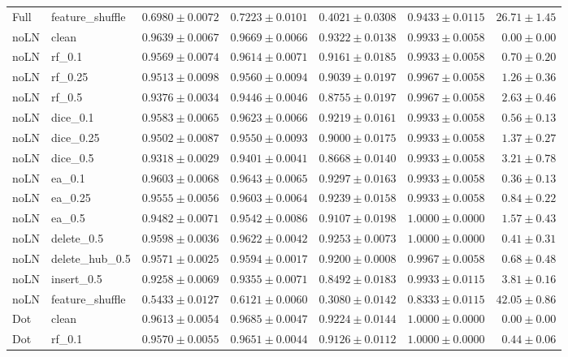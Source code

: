 \documentclass[UTF8,a4paper,11pt,fontset=fandol]{ctexart}
\begin{document}
{\begin{longtable}{llrrrrr}
Full & feature\_shuffle & $0.6980\pm0.0072$ & $0.7223\pm0.0101$ & $0.4021\pm0.0308$ & $0.9433\pm0.0115$ & $26.71\pm1.45$ \\
noLN & clean & $0.9639\pm0.0067$ & $0.9669\pm0.0066$ & $0.9322\pm0.0138$ & $0.9933\pm0.0058$ & $0.00\pm0.00$ \\
noLN & rf\_0.1 & $0.9569\pm0.0074$ & $0.9614\pm0.0071$ & $0.9161\pm0.0185$ & $0.9933\pm0.0058$ & $0.70\pm0.20$ \\
noLN & rf\_0.25 & $0.9513\pm0.0098$ & $0.9560\pm0.0094$ & $0.9039\pm0.0197$ & $0.9967\pm0.0058$ & $1.26\pm0.36$ \\
noLN & rf\_0.5 & $0.9376\pm0.0034$ & $0.9446\pm0.0046$ & $0.8755\pm0.0197$ & $0.9967\pm0.0058$ & $2.63\pm0.46$ \\
noLN & dice\_0.1 & $0.9583\pm0.0065$ & $0.9623\pm0.0066$ & $0.9219\pm0.0161$ & $0.9933\pm0.0058$ & $0.56\pm0.13$ \\
noLN & dice\_0.25 & $0.9502\pm0.0087$ & $0.9550\pm0.0093$ & $0.9000\pm0.0175$ & $0.9933\pm0.0058$ & $1.37\pm0.27$ \\
noLN & dice\_0.5 & $0.9318\pm0.0029$ & $0.9401\pm0.0041$ & $0.8668\pm0.0140$ & $0.9933\pm0.0058$ & $3.21\pm0.78$ \\
noLN & ea\_0.1 & $0.9603\pm0.0068$ & $0.9643\pm0.0065$ & $0.9297\pm0.0163$ & $0.9933\pm0.0058$ & $0.36\pm0.13$ \\
noLN & ea\_0.25 & $0.9555\pm0.0056$ & $0.9603\pm0.0064$ & $0.9239\pm0.0158$ & $0.9933\pm0.0058$ & $0.84\pm0.22$ \\
noLN & ea\_0.5 & $0.9482\pm0.0071$ & $0.9542\pm0.0086$ & $0.9107\pm0.0198$ & $1.0000\pm0.0000$ & $1.57\pm0.43$ \\
noLN & delete\_0.5 & $0.9598\pm0.0036$ & $0.9622\pm0.0042$ & $0.9253\pm0.0073$ & $1.0000\pm0.0000$ & $0.41\pm0.31$ \\
noLN & delete\_hub\_0.5 & $0.9571\pm0.0025$ & $0.9594\pm0.0017$ & $0.9200\pm0.0008$ & $0.9967\pm0.0058$ & $0.68\pm0.48$ \\
noLN & insert\_0.5 & $0.9258\pm0.0069$ & $0.9355\pm0.0071$ & $0.8492\pm0.0183$ & $0.9933\pm0.0115$ & $3.81\pm0.16$ \\
noLN & feature\_shuffle & $0.5433\pm0.0127$ & $0.6121\pm0.0060$ & $0.3080\pm0.0142$ & $0.8333\pm0.0115$ & $42.05\pm0.86$ \\
Dot & clean & $0.9613\pm0.0054$ & $0.9685\pm0.0047$ & $0.9224\pm0.0144$ & $1.0000\pm0.0000$ & $0.00\pm0.00$ \\
Dot & rf\_0.1 & $0.9570\pm0.0055$ & $0.9651\pm0.0044$ & $0.9126\pm0.0112$ & $1.0000\pm0.0000$ & $0.44\pm0.06$ \\

\end{longtable}}
\end{document}
